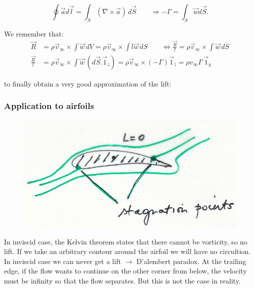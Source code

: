 		\begin{equation}
			\oint \vec{a} d\vec{l} = \int _S (\nabla \times \vec{a})\, d\vec{S} \qquad \Rightarrow -\Gamma = \int _S \vec{w} d\vec{S}.
		\end{equation}
		
		We remember that:
		\begin{equation}
		\begin{aligned}
		\vec{R} &= \rho \vec{v}_\infty \times \int  \vec{w}\, dV = \rho \vec{v}_\infty \times \int  l\vec{w}\, dS \qquad \Leftrightarrow \frac{\vec{R}}{l} = \rho \vec{v}_\infty \times \int  \vec{w}\, dS \\
		\frac{\vec{R}}{l}&= \rho \vec{v}_\infty \times \int  \vec{w}\, (d\vec{S}.\vec{1}_z) = \rho \vec{v}_\infty \times (-\Gamma)\vec{1}_z = \rho v_\infty \Gamma \,\vec{1}_y
		\end{aligned}
		\end{equation}
		
		to finally obtain a very good approximation of the lift:
		
		\begin{center}
		\end{center}
		
	\subsubsection{Application to airfoils}
		\begin{figure}
		\vspace{-5mm}
		\includegraphics[scale=0.35]{ch1/3}
		\end{figure}
		In inviscid case, the Kelvin theorem states that there cannot be vorticity, so no lift. If we take an arbitrary contour around the airfoil we will have no circultion. In inviscid case we can never get a lift $\rightarrow$ D’alembert paradox. At the trailing edge, if the flow wants to continue on the other corner from below, the velocity must be infinity so that the flow separates. But this is not the case in reality. \\

